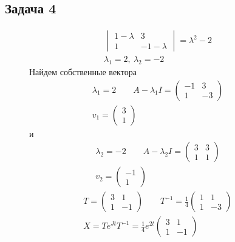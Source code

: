 \newpage
\subsection*{Задача 4}
\begin{figure}[!h]
	\begin{minipage}[h]{0.49\linewidth}
		\begin{gather*}
			\begin{vmatrix}
				1 - \lambda & 3\\
				1 & -1 - \lambda
			\end{vmatrix}
			=
			\lambda^2 - 2\\
			\lambda_1 = 2,\ \lambda_2 = -2
		\end{gather*}
		Найдем собственные вектора
		\begin{gather*}
			\lambda_1 = 2\qquad
			A - \lambda_1 I =
			\begin{pmatrix}
				-1 & 3\\
				1 & -3
			\end{pmatrix}\\
			v_1 =
			\begin{pmatrix}
				3 \\ 1
			\end{pmatrix}
		\end{gather*}
		и
		\begin{gather*}
			\lambda_2 = -2\qquad
			A - \lambda_2 I =
			\begin{pmatrix}
				3 & 3\\
				1 & 1
			\end{pmatrix}\\
			v_2 =
			\begin{pmatrix}
				-1 \\ 1
			\end{pmatrix}
		\end{gather*}
		\begin{gather*}
			T = 
			\begin{pmatrix}
				3 & 1\\
				1 & -1
			\end{pmatrix}\qquad
			T^{-1} = \frac{1}{4}
			\begin{pmatrix}
				1 & 1\\
				1 & -3
			\end{pmatrix}\\
			X = T e^{J t} T^{-1} = \frac{1}{4} e^{2t} 
			\begin{pmatrix}
				3 & 1\\
				1 & -1
			\end{pmatrix}

\end{gather*}
\end{minipage}
\end{figure}
